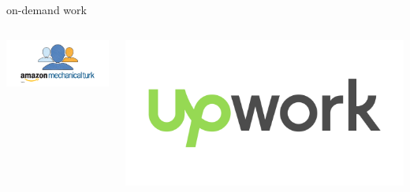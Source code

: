 \documentclass[presentation]{subfiles}
\begin{document}
\begin{frame}{on-demand work}
{\begin{columns}[onlytextwidth]
    \begin{column}{.25\textwidth}
      \includegraphics[width=\textwidth]{../common_figures/amt.png}
    \end{column}
    \begin{column}{.25\textwidth}
      \includegraphics[width=\textwidth]{../common_figures/upwork.png}
    \end{column}


    
  \end{columns}
  }

\end{frame}




\end{document}
